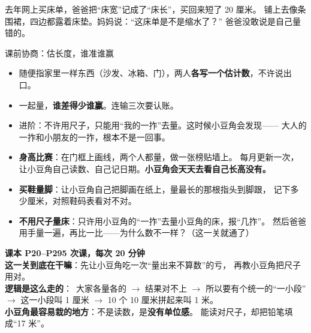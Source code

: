 
\begin{blunder}
去年网上买床单，爸爸把“床宽”记成了“床长”，买回来短了 20 厘米。
铺上去像条围裙，四边都露着床垫。妈妈说：“这床单是不是缩水了？”
爸爸没敢说是自己量错的。
\end{blunder}

\begin{gamble}{课前协商：估长度，谁准谁赢}
\begin{itemize}
  \item 随便指家里一样东西（沙发、冰箱、门），两人\textbf{各写一个估计数}，不许说出口。
  \item 一起量，\textbf{谁差得少谁赢}。连输三次要认账。
  \item 进阶：不许用尺子，只能用“我的一拃”去量。这时候小豆角会发现——
        大人的一拃和小朋友的一拃，根本不是一回事。
\end{itemize}
\negolines
\end{gamble}

\begin{bonus}
\begin{itemize}
  \item \textbf{身高比赛}：在门框上画线，两个人都量，做一张榜贴墙上。
        每月更新一次，让小豆角自己读数、自己记日期。\textbf{小豆角会天天去看自己长高没有。}
  \item \textbf{买鞋量脚}：让小豆角自己把脚画在纸上，量最长的那根指头到脚跟，
        记下多少厘米，对照鞋码表看对不对。
  \item \textbf{不用尺子量床}：只许用小豆角的“一拃”去量小豆角的床，报“几拃”。
        然后爸爸用手量一遍，再比一比——为什么数不一样？（这一关就通了）
\end{itemize}
\end{bonus}

\begin{unitinfo}
\textbf{课本 P20--P29}\quad \textbf{5 次课，每次 20 分钟} \\[4pt]
\textbf{这一关到底在干嘛}：先让小豆角吃一次“量出来不算数”的亏，
再教小豆角把尺子用对。\\
\textbf{逻辑是这么走的}：\ 大家各量各的 $\to$ 结果对不上 $\to$ 所以要有个统一的“一小段”
$\to$ 这一小段叫 1 厘米 $\to$ 10 个 10 厘米拼起来叫 1 米。\\
\textbf{小豆角最容易栽的地方}：不是读数，是\textbf{没有单位感}。
能读对尺子，却把铅笔填成“17 米”。
\end{unitinfo}

